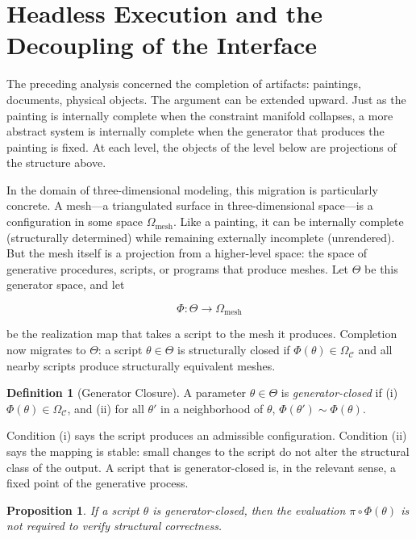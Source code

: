 \documentclass[12pt, twoside]{article}
\theoremstyle{plain}
\newtheorem{proposition}[theorem]{Proposition}
\theoremstyle{definition}
\newtheorem{definition}[theorem]{Definition}
\theoremstyle{remark}
\newcommand{\OmC}{\Omega_{\mathcal{C}}}
\begin{document}
\section{Headless Execution and the Decoupling of the Interface}
\label{sec:headless}

The preceding analysis concerned the completion of artifacts: paintings, documents, physical objects. The argument can be extended upward. Just as the painting is internally complete when the constraint manifold collapses, a more abstract system is internally complete when the generator that produces the painting is fixed. At each level, the objects of the level below are projections of the structure above.

In the domain of three-dimensional modeling, this migration is particularly concrete. A mesh---a triangulated surface in three-dimensional space---is a configuration in some space $\Omega_{\text{mesh}}$. Like a painting, it can be internally complete (structurally determined) while remaining externally incomplete (unrendered). But the mesh itself is a projection from a higher-level space: the space of generative procedures, scripts, or programs that produce meshes. Let $\Theta$ be this generator space, and let

\[
\Phi : \Theta \to \Omega_{\text{mesh}}
\]

be the realization map that takes a script to the mesh it produces. Completion now migrates to $\Theta$: a script $\theta \in \Theta$ is structurally closed if $\Phi(\theta) \in \OmC$ and all nearby scripts produce structurally equivalent meshes.

\begin{definition}[Generator Closure]
\label{def:generator-closure}
A parameter $\theta \in \Theta$ is \emph{generator-closed} if (i) $\Phi(\theta) \in \OmC$, and (ii) for all $\theta'$ in a neighborhood of $\theta$, $\Phi(\theta') \sim \Phi(\theta)$.
\end{definition}

Condition (i) says the script produces an admissible configuration. Condition (ii) says the mapping is stable: small changes to the script do not alter the structural class of the output. A script that is generator-closed is, in the relevant sense, a fixed point of the generative process.

\begin{proposition}
\label{prop:headless}
If a script $\theta$ is generator-closed, then the evaluation $\pi \circ \Phi(\theta)$ is not required to verify structural correctness.
\end{proposition}
\end{document}
